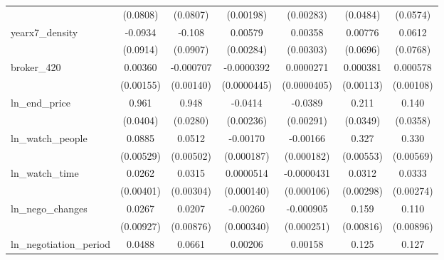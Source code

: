{\begin{tabular}{l*{6}{c}}
            &    (0.0808)         &    (0.0807)         &   (0.00198)         &   (0.00283)         &    (0.0484)         &    (0.0574)         \\
\addlinespace
yearx7\_density&     -0.0934         &      -0.108         &     0.00579\sym{**} &     0.00358         &     0.00776         &      0.0612         \\
            &    (0.0914)         &    (0.0907)         &   (0.00284)         &   (0.00303)         &    (0.0696)         &    (0.0768)         \\
\addlinespace
broker\_420  &     0.00360\sym{**} &   -0.000707         &  -0.0000392         &   0.0000271         &    0.000381         &    0.000578         \\
            &   (0.00155)         &   (0.00140)         & (0.0000445)         & (0.0000405)         &   (0.00113)         &   (0.00108)         \\
\addlinespace
ln\_end\_price&       0.961\sym{***}&       0.948\sym{***}&     -0.0414\sym{***}&     -0.0389\sym{***}&       0.211\sym{***}&       0.140\sym{***}\\
            &    (0.0404)         &    (0.0280)         &   (0.00236)         &   (0.00291)         &    (0.0349)         &    (0.0358)         \\
\addlinespace
ln\_watch\_people&      0.0885\sym{***}&      0.0512\sym{***}&    -0.00170\sym{***}&    -0.00166\sym{***}&       0.327\sym{***}&       0.330\sym{***}\\
            &   (0.00529)         &   (0.00502)         &  (0.000187)         &  (0.000182)         &   (0.00553)         &   (0.00569)         \\
\addlinespace
ln\_watch\_time&      0.0262\sym{***}&      0.0315\sym{***}&   0.0000514         &  -0.0000431         &      0.0312\sym{***}&      0.0333\sym{***}\\
            &   (0.00401)         &   (0.00304)         &  (0.000140)         &  (0.000106)         &   (0.00298)         &   (0.00274)         \\
\addlinespace
ln\_nego\_changes&      0.0267\sym{***}&      0.0207\sym{**} &    -0.00260\sym{***}&   -0.000905\sym{***}&       0.159\sym{***}&       0.110\sym{***}\\
            &   (0.00927)         &   (0.00876)         &  (0.000340)         &  (0.000251)         &   (0.00816)         &   (0.00896)         \\
\addlinespace
ln\_negotiation\_period&      0.0488\sym{***}&      0.0661\sym{***}&     0.00206\sym{***}&     0.00158\sym{***}&       0.125\sym{***}&       0.127\sym{***}\\

\end{tabular}}
